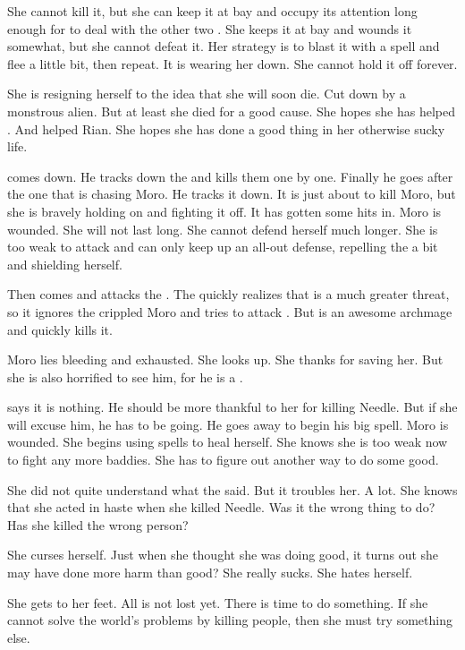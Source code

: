 She cannot kill it, but she can keep it at bay and occupy its attention long enough for \Psyrex to deal with the other two \banes. 
She keeps it at bay and wounds it somewhat, but she cannot defeat it. 
Her strategy is to blast it with a spell and flee a little bit, then repeat. 
It is wearing her down.
She cannot hold it off forever. 

She is resigning herself to the idea that she will soon die.
Cut down by a monstrous alien. 
But at least she died for a good cause.
She hopes she has helped \Malcur.
And helped Rian.
She hopes she has done a good thing in her otherwise sucky life. 

\Psyrex comes down.
He tracks down the \banes and kills them one by one.
Finally he goes after the one that is chasing Moro.
He tracks it down.
It is just about to kill Moro, but she is bravely holding on and fighting it off.
It has gotten some hits in.
Moro is wounded.
She will not last long. 
She cannot defend herself much longer. 
She is too weak to attack and can only keep up an all-out defense, repelling the \bane a bit and shielding herself. 

Then \Psyrex comes and attacks the \bane. 
The \bane quickly realizes that \Psyrex is a much greater threat, so it ignores the crippled Moro and tries to attack \Psyrex. 
But \Psyrex is an awesome archmage and quickly kills it. 

Moro lies bleeding and exhausted. 
She looks up. 
She thanks \Psyrex for saving her. 
But she is also horrified to see him, for he is a \serpentman. 

\Psyrex says it is nothing. 
He should be more thankful to her for killing Needle. 
But if she will excuse him, he has to be going.
He goes away to begin his big spell. 
Moro is wounded. 
She begins using spells to heal herself. 
She knows she is too weak now to fight any more baddies. 
She has to figure out another way to do some good. 

She did not quite understand what the \serpentman said. 
But it troubles her.
A lot. 
She knows that she acted in haste when she killed Needle. 
Was it the wrong thing to do?
Has she killed the wrong person?

She curses herself.
Just when she thought she was doing good, it turns out she may have done more harm than good?
She really sucks. 
She hates herself. 

She gets to her feet.
All is not lost yet.
There is time to do something.
If she cannot solve the world's problems by killing people, then she must try something else. 





